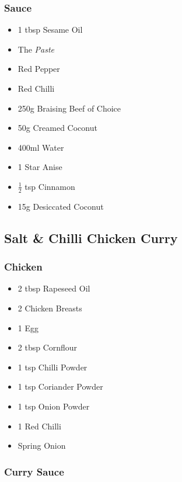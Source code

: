\documentclass[11pt, english]{article}
\begin{document}
		\subsubsection*{Sauce}

	\begin{itemize}
        \setlength\itemsep{0cm}
                \item 1 tbsp Sesame Oil
                \item The \textit{Paste}
                \item Red Pepper
		\item Red Chilli
		\item 250g Braising Beef of Choice
                \item 50g Creamed Coconut
		\item 400ml Water
		\item 1 Star Anise
		\item $\frac{1}{2}$ tsp Cinnamon
		\item 15g Desiccated Coconut
        \end{itemize}

\newpage

	\subsection{Salt \& Chilli Chicken Curry}

		\subsubsection*{Chicken}

	\begin{itemize}
        \setlength\itemsep{0cm}
                \item 2 tbsp Rapeseed Oil
		\item 2 Chicken Breasts
		\item 1 Egg
		\item 2 tbsp Cornflour
		\item 1 tsp Chilli Powder
		\item 1 tsp Coriander Powder
		\item 1 tsp Onion Powder
		\item 1 Red Chilli
		\item Spring Onion
        \end{itemize}

		\subsubsection*{Curry Sauce}
\end{document}
